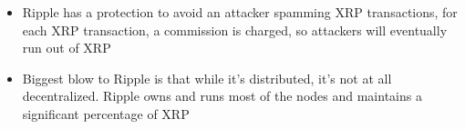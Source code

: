 \begin{itemize}
	\item Ripple has a protection to avoid an attacker spamming XRP transactions, for each XRP transaction, a commission is charged, so attackers will eventually run out of XRP
	\item Biggest blow to Ripple is that while it's distributed, it's not at all decentralized. Ripple owns and runs most of the nodes and maintains a significant percentage of XRP
\end{itemize}